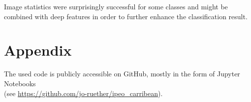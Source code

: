 \documentclass[11pt]{article}
\begin{document}
	Image statistics were surprisingly successful for some classes and might be combined with deep features in order to further enhance the classification result.
	
	\section{Appendix}

	The used code is publicly accessible on GitHub, mostly in the form of Jupyter Notebooks \\
	(see \url{https://github.com/jo-ruether/ipeo_carribean}).
	
	 
	
\end{document}
